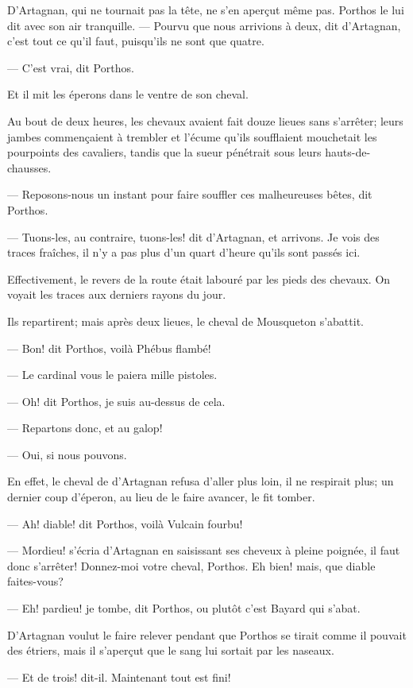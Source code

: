 D'Artagnan, qui ne tournait pas la tête, ne s'en aperçut même pas. Porthos le lui dit avec son air tranquille.
— Pourvu que nous arrivions à deux, dit d'Artagnan, c'est tout ce qu'il faut, puisqu'ils ne sont que quatre.

— C'est vrai, dit Porthos.

Et il mit les éperons dans le ventre de son cheval.

Au bout de deux heures, les chevaux avaient fait douze lieues sans s'arrêter; leurs jambes commençaient à trembler et l'écume qu'ils soufflaient mouchetait les pourpoints des cavaliers, tandis que la sueur pénétrait sous leurs hauts-de-chausses.

— Reposons-nous un instant pour faire souffler ces malheureuses bêtes, dit Porthos.

— Tuons-les, au contraire, tuons-les! dit d'Artagnan, et arrivons. Je vois des traces fraîches, il n'y a pas plus d'un quart d'heure qu'ils sont passés ici.

Effectivement, le revers de la route était labouré par les pieds des chevaux. On voyait les traces aux derniers rayons du jour.

Ils repartirent; mais après deux lieues, le cheval de Mousqueton s'abattit.

— Bon! dit Porthos, voilà Phébus flambé!

— Le cardinal vous le paiera mille pistoles.

— Oh! dit Porthos, je suis au-dessus de cela.

— Repartons donc, et au galop!

— Oui, si nous pouvons.

En effet, le cheval de d'Artagnan refusa d'aller plus loin, il ne respirait plus; un dernier coup d'éperon, au lieu de le faire avancer, le fit tomber.

— Ah! diable! dit Porthos, voilà Vulcain fourbu!

— Mordieu! s'écria d'Artagnan en saisissant ses cheveux à pleine poignée, il faut donc s'arrêter! Donnez-moi votre cheval, Porthos. Eh bien! mais, que diable faites-vous?

— Eh! pardieu! je tombe, dit Porthos, ou plutôt c'est Bayard qui s'abat.

D'Artagnan voulut le faire relever pendant que Porthos se tirait comme il pouvait des étriers, mais il s'aperçut que le sang lui sortait par les naseaux.

— Et de trois! dit-il. Maintenant tout est fini!

